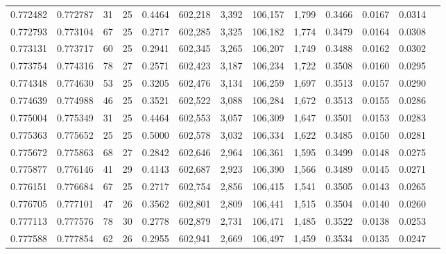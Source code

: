 \begin{tabular}{rrrrrrrrrrrrr}
0.772482 & 0.772787 &  31 &  25 &                                     0.4464 & 602,218 &   3,392 & 106,157 &   1,799 & 0.3466 & 0.0167 & 0.0314 \\
0.772793 & 0.773104 &  67 &  25 &                                     0.2717 & 602,285 &   3,325 & 106,182 &   1,774 & 0.3479 & 0.0164 & 0.0308 \\
0.773131 & 0.773717 &  60 &  25 &                                     0.2941 & 602,345 &   3,265 & 106,207 &   1,749 & 0.3488 & 0.0162 & 0.0302 \\
0.773754 & 0.774316 &  78 &  27 &                                     0.2571 & 602,423 &   3,187 & 106,234 &   1,722 & 0.3508 & 0.0160 & 0.0295 \\
0.774348 & 0.774630 &  53 &  25 &                                     0.3205 & 602,476 &   3,134 & 106,259 &   1,697 & 0.3513 & 0.0157 & 0.0290 \\
0.774639 & 0.774988 &  46 &  25 &                                     0.3521 & 602,522 &   3,088 & 106,284 &   1,672 & 0.3513 & 0.0155 & 0.0286 \\
0.775004 & 0.775349 &  31 &  25 &                                     0.4464 & 602,553 &   3,057 & 106,309 &   1,647 & 0.3501 & 0.0153 & 0.0283 \\
0.775363 & 0.775652 &  25 &  25 &                                     0.5000 & 602,578 &   3,032 & 106,334 &   1,622 & 0.3485 & 0.0150 & 0.0281 \\
0.775672 & 0.775863 &  68 &  27 &                                     0.2842 & 602,646 &   2,964 & 106,361 &   1,595 & 0.3499 & 0.0148 & 0.0275 \\
0.775877 & 0.776146 &  41 &  29 &                                     0.4143 & 602,687 &   2,923 & 106,390 &   1,566 & 0.3489 & 0.0145 & 0.0271 \\
0.776151 & 0.776684 &  67 &  25 &                                     0.2717 & 602,754 &   2,856 & 106,415 &   1,541 & 0.3505 & 0.0143 & 0.0265 \\
0.776705 & 0.777101 &  47 &  26 &                                     0.3562 & 602,801 &   2,809 & 106,441 &   1,515 & 0.3504 & 0.0140 & 0.0260 \\
0.777113 & 0.777576 &  78 &  30 &                                     0.2778 & 602,879 &   2,731 & 106,471 &   1,485 & 0.3522 & 0.0138 & 0.0253 \\
0.777588 & 0.777854 &  62 &  26 &                                     0.2955 & 602,941 &   2,669 & 106,497 &   1,459 & 0.3534 & 0.0135 & 0.0247 \\

\end{tabular}
